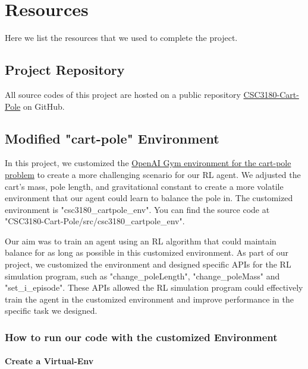 \documentclass[10pt,a4paper]{article}
\begin{document}


\section{Resources}
Here we list  the resources that we used to complete the project. 

\subsection{Project Repository}
All source codes of this project are hosted on a public repository \href{https://github.com/zixingjiang/CSC3180-Cart-Pole}{CSC3180-Cart-Pole} on GitHub. 


\subsection{Modified "cart-pole" Environment}\label{5.2}
In this project, we customized the \href{https://gymnasium.farama.org/environments/classic_control/cart_pole/}{OpenAI Gym environment for the cart-pole problem} to create a more challenging scenario for our RL agent. We adjusted the cart's mass, pole length, and gravitational constant to create a more volatile environment that our agent could learn to balance the pole in. The customized environment is "csc3180\_cartpole\_env". You can find the source code at "CSC3180-Cart-Pole/src/csc3180\_cartpole\_env".

Our aim was to train an agent using an RL algorithm that could maintain balance for as long as possible in this customized environment. As part of our project, we customized the environment and designed specific APIs for the RL simulation program, such as "change\_poleLength", "change\_poleMass" and "set\_i\_episode". These APIs allowed the RL simulation program could effectively train the agent in the customized environment and improve performance in the specific task we designed. 

\subsubsection{How to run our code with the customized Environment}
\paragraph{Create a Virtual-Env}
\end{document}
